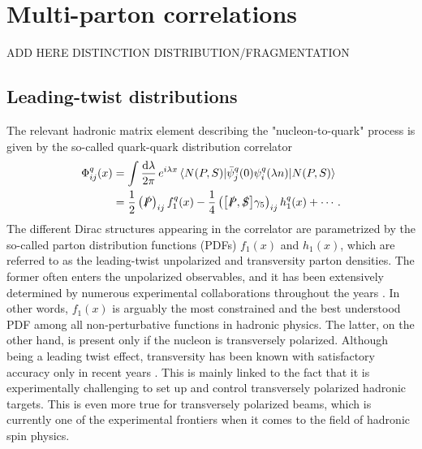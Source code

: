 \section{Multi-parton correlations}
ADD HERE DISTINCTION DISTRIBUTION/FRAGMENTATION\\
\subsection{Leading-twist distributions}
The relevant hadronic matrix element describing the "nucleon-to-quark" process is given by the so-called quark-quark distribution correlator
\begin{equation}
    \begin{aligned}
        \Phi^q_{ij}(x)&= \int\frac{\dd \lambda}{2\pi} \,e^{i\lambda x}\mel{N(P,S)}{\bar \psi^q_j(0) \psi^q_i(\lambda n)}{N(P,S)}\\
        &= \frac{1}{2}\left(\slashed{P}\right)_{ij} f^q_1(x)
        -\frac{1}{4} \left(\comm{\slashed{P}}{\slashed{S}}\gamma_5\right)_{ij} h^q_1(x)+\cdots .
    \end{aligned}
\end{equation}
The different Dirac structures appearing in the correlator are parametrized by the so-called parton distribution functions (PDFs) $f_1(x)$ and $h_1(x)$, which are referred to as the leading-twist unpolarized and transversity parton densities. The former often enters the unpolarized observables, and it has been extensively determined by numerous experimental collaborations throughout the years \cite{}. In other words, $f_1(x)$ is arguably the most constrained and the best understood PDF among all non-perturbative functions in hadronic physics. The latter, on the other hand, is present only if the nucleon is transversely polarized. Although being a leading twist effect, transversity has been known with satisfactory accuracy only in recent years \cite{Gamberg2022Htilde}. This is mainly linked to the fact that it is experimentally challenging to set up and control transversely polarized hadronic targets. This is even more true for transversely polarized beams, which is currently one of the experimental frontiers when it comes to the field of hadronic spin physics.

